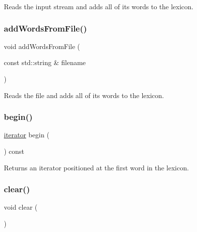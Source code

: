Reads the input stream and adds all of its words to the lexicon. 

\mbox{\label{classDawgLexicon_a3891deaa85aee9a52b6ca258d1514716}} 
\subsubsection{\texorpdfstring{add\+Words\+From\+File()}{addWordsFromFile()}\hspace{0.1cm}{\footnotesize\ttfamily [2/2]}}
{\footnotesize\ttfamily void add\+Words\+From\+File (\begin{DoxyParamCaption}\item[{const std\+::string \&}]{filename }\end{DoxyParamCaption})}



Reads the file and adds all of its words to the lexicon. 

\mbox{\label{classDawgLexicon_a0c62c15c8ed609e7e5e9518cf5f5c712}} 
\subsubsection{\texorpdfstring{begin()}{begin()}}
{\footnotesize\ttfamily \mbox{\hyperlink{classDawgLexicon_1_1iterator}{iterator}} begin (\begin{DoxyParamCaption}{ }\end{DoxyParamCaption}) const\hspace{0.3cm}{\ttfamily [inline]}}



Returns an iterator positioned at the first word in the lexicon. 

\mbox{\label{classDawgLexicon_ac8bb3912a3ce86b15842e79d0b421204}} 
\subsubsection{\texorpdfstring{clear()}{clear()}}
{\footnotesize\ttfamily void clear (\begin{DoxyParamCaption}{ }\end{DoxyParamCaption})}



